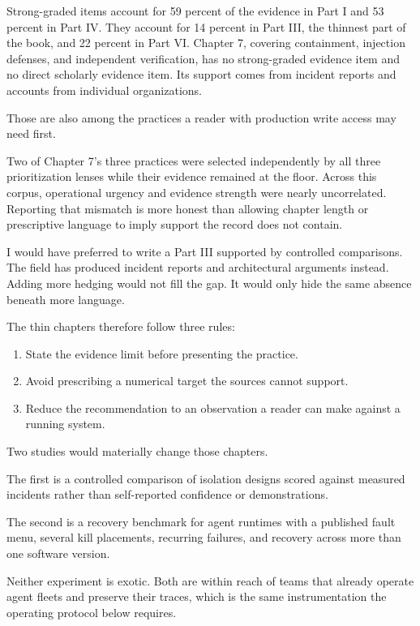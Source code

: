 Strong-graded items account for 59 percent of the evidence in Part I and 53 percent in Part IV. They account for 14 percent in Part III, the thinnest part of the book, and 22 percent in Part VI. Chapter 7, covering containment, injection defenses, and independent verification, has no strong-graded evidence item and no direct scholarly evidence item. Its support comes from incident reports and accounts from individual organizations.

Those are also among the practices a reader with production write access may need first.

Two of Chapter 7's three practices were selected independently by all three prioritization lenses while their evidence remained at the floor. Across this corpus, operational urgency and evidence strength were nearly uncorrelated. Reporting that mismatch is more honest than allowing chapter length or prescriptive language to imply support the record does not contain.

I would have preferred to write a Part III supported by controlled comparisons. The field has produced incident reports and architectural arguments instead. Adding more hedging would not fill the gap. It would only hide the same absence beneath more language.

The thin chapters therefore follow three rules:

\begin{enumerate}
\def\labelenumi{\arabic{enumi}.}
\tightlist
\item
  State the evidence limit before presenting the practice.
\item
  Avoid prescribing a numerical target the sources cannot support.
\item
  Reduce the recommendation to an observation a reader can make against a running system.
\end{enumerate}

Two studies would materially change those chapters.

The first is a controlled comparison of isolation designs scored against measured incidents rather than self-reported confidence or demonstrations.

The second is a recovery benchmark for agent runtimes with a published fault menu, several kill placements, recurring failures, and recovery across more than one software version.

Neither experiment is exotic. Both are within reach of teams that already operate agent fleets and preserve their traces, which is the same instrumentation the operating protocol below requires.

